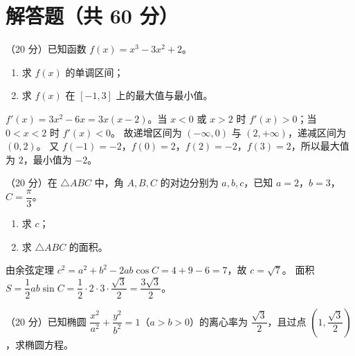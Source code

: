 \documentclass{exam-zh}
\begin{document}
\section{解答题（共 60 分）}
\begin{problem}
（20 分）已知函数 $f(x)=x^3-3x^2+2$。
\begin{enumerate}
\item 求 $f(x)$ 的单调区间；
\item 求 $f(x)$ 在 $[-1,3]$ 上的最大值与最小值。
\end{enumerate}
\end{problem}
\begin{solution}
$f'(x)=3x^2-6x=3x(x-2)$。当 $x<0$ 或 $x>2$ 时 $f'(x)>0$；当 $0<x<2$ 时 $f'(x)<0$。
故递增区间为 $(-\infty,0)$ 与 $(2,+\infty)$，递减区间为 $(0,2)$。
又 $f(-1)=-2$，$f(0)=2$，$f(2)=-2$，$f(3)=2$，所以最大值为 $2$，最小值为 $-2$。
\end{solution}
\begin{problem}
（20 分）在 $\triangle ABC$ 中，角 $A,B,C$ 的对边分别为 $a,b,c$，已知 $a=2$，$b=3$，$C=\dfrac{\pi}{3}$。
\begin{enumerate}
\item 求 $c$；
\item 求 $\triangle ABC$ 的面积。
\end{enumerate}
\end{problem}
\begin{solution}
由余弦定理 $c^2=a^2+b^2-2ab\cos C=4+9-6=7$，故 $c=\sqrt{7}$。
面积 $S=\dfrac12 ab\sin C=\dfrac12\cdot2\cdot3\cdot\dfrac{\sqrt3}{2}=\dfrac{3\sqrt3}{2}$。
\end{solution}
\begin{problem}
（20 分）已知椭圆 $\dfrac{x^2}{a^2}+\dfrac{y^2}{b^2}=1$（$a>b>0$）的离心率为 $\dfrac{\sqrt3}{2}$，且过点 $\left(1,\dfrac{\sqrt3}{2}\right)$，求椭圆方程。
\end{problem}
\end{document}
